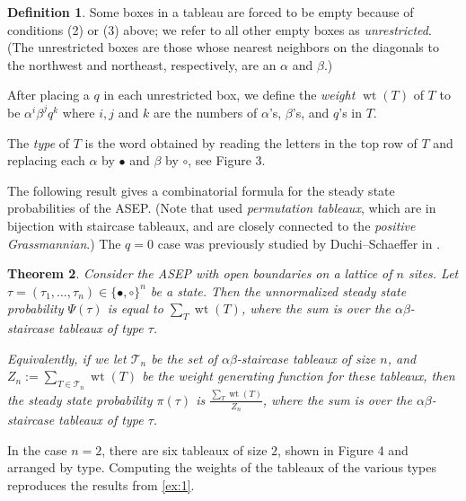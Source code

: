 \documentclass[11pt]{amsart}
\DeclareMathOperator{\wt}{wt}
\newtheorem{theorem}{Theorem}[section]
\theoremstyle{definition}
\newtheorem{definition}[theorem]{Definition}
\theoremstyle{remark}
\begin{document}
\begin{definition}
Some boxes in a tableau
	are forced to be empty because of conditions (2) or (3) above;
 we refer
to all other empty boxes as \emph{unrestricted}.  (The
unrestricted
boxes are  those whose nearest neighbors on the diagonals
	to the northwest and northeast, respectively, are an $\alpha$ and $\beta$.)

	After placing a $q$
	in each unrestricted box, we define the 
	\emph{weight} $\wt(T)$ of $T$ to be 
	$\alpha^i \beta^j q^k$ where $i, j$ and $k$ are the 
	numbers of $\alpha$'s, $\beta$'s, and $q$'s in $T$.


	The \emph{type} of $T$ is the word
	obtained by reading the letters in the top row of $T$
	and replacing each $\alpha$ by $\bullet$ and $\beta$ by 
	$\circ$, 
see Figure 3.
\end{definition}


The following result \cite{CW1, CW2, CW4}
gives a combinatorial formula for the steady state 
probabilities of the ASEP.  (Note that \cite{CW1, CW2} used 
\emph{permutation tableaux}, which are in bijection with staircase tableaux,
and are closely connected to the \emph{positive Grassmannian}.)
The $q=0$ case was previously
studied by Duchi--Schaeffer in \cite{DS}.

\begin{theorem}\label{thm:1}
Consider the ASEP with open boundaries on a lattice of $n$ sites.
Let $\tau=(\tau_1,\dots, \tau_n)\in \{\bullet,\circ\}^n$ be
	a state.  Then the 
	unnormalized steady state probability $\Psi(\tau)$ is equal to 
 $\sum_T \wt(T)$, where the sum is over the 
$\alpha \beta$-staircase tableaux of type $\tau$.

Equivalently, if 
we let $\mathcal{T}_n$ be the set of $\alpha \beta$-staircase 
tableaux of size $n$, and  $Z_n:= \sum_{T\in \mathcal{T}_n} \wt(T)$
be the weight generating function for these tableaux, then 
the	steady state probability $\pi(\tau)$
is $\frac{\sum_T \wt(T)}{Z_n}$, where the sum is over the 
$\alpha \beta$-staircase tableaux of type $\tau$.
\end{theorem}


In the case $n=2$, there are six tableaux of size
$2$, shown in Figure 4 and arranged by type.   Computing the weights
of the tableaux of the various types reproduces the 
results from \cref{ex:1}.
\end{document}
